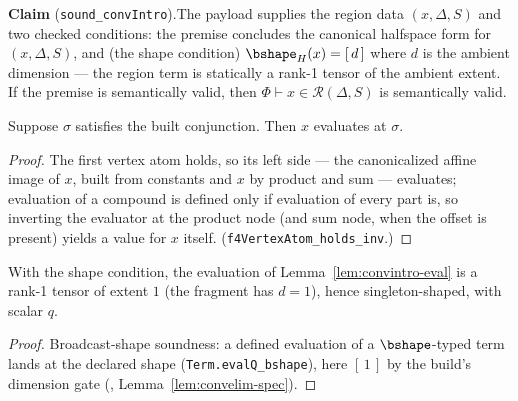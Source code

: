 

\textbf{Claim} (\texttt{sound\_convIntro}).\enspace The payload supplies
the region data $(x, \Delta, S)$ and two checked conditions: the premise
concludes the canonical halfspace form for $(x, \Delta, S)$, and (the
shape condition) $\bshape_H(x) = [\,d\,]$ where $d$ is the ambient
dimension --- the region term is statically a rank-1 tensor of the
ambient extent. If the premise is semantically valid, then
$\Phi \vdash x \in \mathcal{R}(\Delta, S)$ is semantically valid.

\begin{blemma}
\label{lem:convintro-eval}
Suppose $\sigma$ satisfies the built conjunction. Then $x$ evaluates at
$\sigma$.
\end{blemma}
\begin{proof}
The first vertex atom holds, so its left side --- the canonicalized
affine image of $x$, built from constants and $x$ by product and sum ---
evaluates; evaluation of a compound is defined only if evaluation of
every part is, so inverting the evaluator at the product node (and sum
node, when the offset is present) yields a value for $x$ itself.
(\texttt{f4VertexAtom\_holds\_inv}.)
\end{proof}

\begin{blemma}
\label{lem:convintro-shape}
With the shape condition, the evaluation of Lemma~\ref{lem:convintro-eval}
is a rank-1 tensor of extent $1$ (the fragment has $d = 1$), hence
singleton-shaped, with scalar $q$.
\end{blemma}
\begin{proof}
Broadcast-shape soundness: a defined evaluation of a $\bshape$-typed term
lands at the declared shape (\texttt{Term.evalQ\_bshape}), here $[\,1\,]$
by the build's dimension gate (,
Lemma~\ref{lem:convelim-spec}).
\end{proof}

